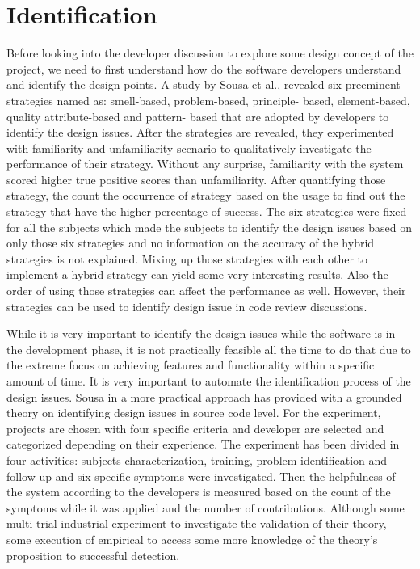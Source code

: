 \section{Identification}
\label{sect:identification}

Before looking into the developer discussion to explore some design concept of the project, we need to first understand how do the software developers understand and identify the design points. A study by Sousa et al.,\cite{Sousa2017} revealed six preeminent strategies named as: smell-based, problem-based, principle- based, element-based, quality attribute-based and pattern- based that are adopted by developers to identify the design issues. After the strategies are revealed, they experimented with familiarity and unfamiliarity scenario to qualitatively investigate the performance of their strategy. Without any surprise, familiarity with the system scored higher true positive scores than unfamiliarity. After quantifying those strategy, the count the occurrence of strategy based on the usage to find out the strategy that have the higher percentage of success. The six strategies were fixed for all the subjects which made the subjects to identify the design issues based on only those six strategies and no information on the accuracy of the hybrid strategies is not explained. Mixing up those strategies with each other to implement a hybrid strategy can yield some very interesting results. Also the order of using those strategies can affect the performance as well. However, their strategies can be used to identify design issue in code review discussions.

        
While it is very important to identify the design issues while the software is in the development phase, it is not practically feasible all the time to do that due to the extreme focus on achieving features and functionality within a specific amount of time. It is very important to automate the identification process of the design issues. Sousa in a more practical approach \cite{Sousa2018} has provided with a grounded theory on identifying design issues in source code level. For the experiment, projects are chosen with four specific criteria and developer are selected and categorized depending on their experience. The experiment has been divided in four activities: subjects characterization, training, problem identification and follow-up and six specific symptoms were investigated. Then the helpfulness of the system according to the developers is measured based on the count of the symptoms while it was applied and the number of contributions. Although some multi-trial industrial experiment to investigate the validation of their theory, some execution of empirical to access some more knowledge of the theory's proposition to successful detection.

    